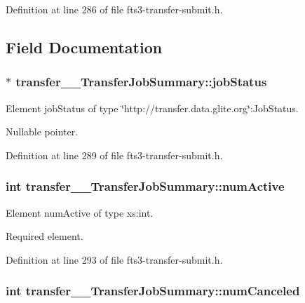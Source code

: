 Definition at line 286 of file fts3-\/transfer-\/submit.h.



\subsection{Field Documentation}
\subsubsection[{jobStatus}]{ $\ast$ {\bf transfer\_\-\_\-TransferJobSummary::jobStatus}}\label{classtransfer____TransferJobSummary_ac3a623ce12953dc1b8bc55bde5661e9d}


Element jobStatus of type \char`\"{}http://transfer.data.glite.org\char`\"{}:JobStatus. 

Nullable pointer. 

Definition at line 289 of file fts3-\/transfer-\/submit.h.

\subsubsection[{numActive}]{\setlength{\rightskip}{0pt plus 5cm}int {\bf transfer\_\-\_\-TransferJobSummary::numActive}}\label{classtransfer____TransferJobSummary_abad0632f4ab1ce47be933c8b8427f047}


Element numActive of type xs:int. 

Required element. 

Definition at line 293 of file fts3-\/transfer-\/submit.h.

\subsubsection[{numCanceled}]{\setlength{\rightskip}{0pt plus 5cm}int {\bf transfer\_\-\_\-TransferJobSummary::numCanceled}}\label{classtransfer____TransferJobSummary_a1a213ed80c66cc147369d3f63fa8cb28}


